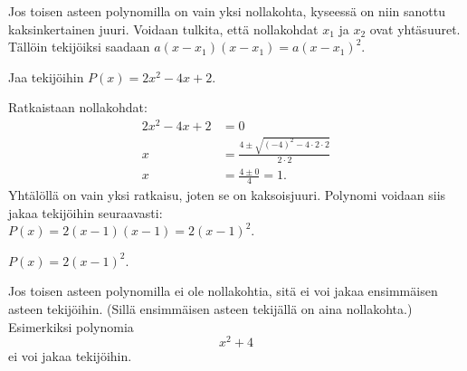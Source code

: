 Jos toisen asteen polynomilla on vain yksi nollakohta, kyseessä on niin sanottu kaksinkertainen juuri. Voidaan tulkita, että nollakohdat $x_1$ ja $x_2$ ovat yhtäsuuret. Tällöin tekijöiksi saadaan $a(x-x_1)(x-x_1)=a(x-x_1)^2$.

\begin{esimerkki}
Jaa tekijöihin $P(x)=2x^2-4x+2$.
\begin{esimratk}
Ratkaistaan nollakohdat:
\begin{align*}
2x^2-4x+2 &= 0	\\
x &= \frac{4\pm \sqrt{(-4)^2-4\cdot 2 \cdot 2}}{2\cdot 2} \\
x &= \frac{4 \pm 0}{4} = 1.
\end{align*}
Yhtälöllä on vain yksi ratkaisu, joten se on kaksoisjuuri.
Polynomi voidaan siis jakaa tekijöihin seuraavasti: \\ $P(x)=2(x-1)(x-1)=2(x-1)^2$. 
\end{esimratk}
\begin{esimvast}
$P(x)=2(x-1)^2$.
\end{esimvast}
\end{esimerkki}

Jos toisen asteen polynomilla ei ole nollakohtia, sitä ei voi jakaa ensimmäisen asteen tekijöihin. (Sillä ensimmäisen asteen tekijällä on aina nollakohta.) Esimerkiksi polynomia $$x^2+4$$ ei voi jakaa tekijöihin. %